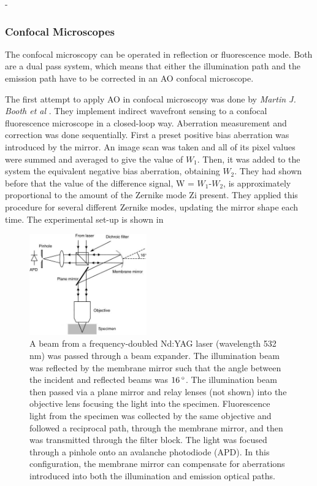 -
\subsubsection{Confocal Microscopes}
\label{sec:ConfocalMicroscopes}

The confocal microscopy can be operated in reflection or fluorescence mode. Both are a dual pass system, which means that either the illumination path and the emission path have to be corrected in an AO confocal microscope. 

The first attempt to apply AO in confocal microscopy was done by \textit{Martin J. Booth et al} \cite{AOM_scan_CFM}. They implement indirect wavefront sensing to a confocal fluorescence microscope in a closed-loop way. Aberration measurement and correction was done sequentially. First a preset positive bias aberration was introduced by the mirror. An image scan was taken and all of its pixel values were summed and averaged to give the value of $W_1$. Then, it was added to the system the equivalent negative bias aberration, obtaining $W_2$. They had shown before that the value of the difference signal, W = $W_1$-$W_2$, is approximately proportional to the amount of the Zernike mode Zi present. They applied this procedure for several different Zernike modes, updating the mirror shape each time. The experimental set-up is shown in 

\begin{figure}[htbp]
	\centering
		\includegraphics[width=0.45\textwidth]{images/AOM_scan_CFM.jpg}
		\caption{A beam from a frequency-doubled Nd:YAG laser (wavelength 532 nm) was passed through a beam expander. The illumination beam was reflected by the membrane mirror such that the angle between the incident and reflected beams was $\unit[16]{^{\circ}}$. The illumination beam then passed via a plane mirror and relay lenses (not shown) into the objective lens focusing the light into the specimen. Fluorescence light from the specimen was collected by the same objective and followed a reciprocal path, through the membrane mirror, and then was transmitted through the filter block. The light was focused through a pinhole onto an avalanche photodiode (APD). In this configuration, the membrane mirror can compensate for aberrations introduced into both the illumination and emission optical paths.}
	\label{fig:AOM_scan_CFM}
\end{figure}

